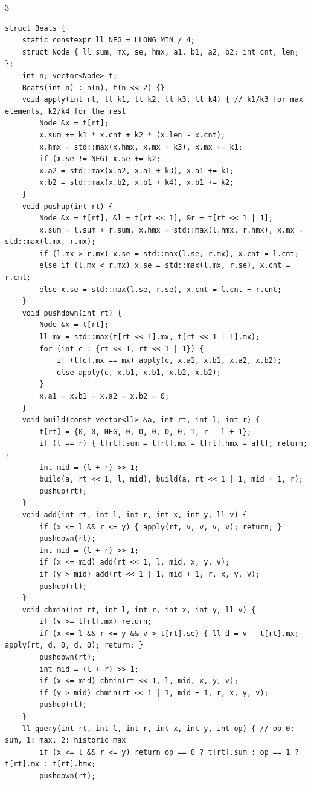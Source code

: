 \documentclass[8pt]{extarticle}
\begin{document}
\begin{multicols*}{3}
\begin{lstlisting}
struct Beats {
    static constexpr ll NEG = LLONG_MIN / 4;
    struct Node { ll sum, mx, se, hmx, a1, b1, a2, b2; int cnt, len; };
    int n; vector<Node> t;
    Beats(int n) : n(n), t(n << 2) {}
    void apply(int rt, ll k1, ll k2, ll k3, ll k4) { // k1/k3 for max elements, k2/k4 for the rest
        Node &x = t[rt];
        x.sum += k1 * x.cnt + k2 * (x.len - x.cnt);
        x.hmx = std::max(x.hmx, x.mx + k3), x.mx += k1;
        if (x.se != NEG) x.se += k2;
        x.a2 = std::max(x.a2, x.a1 + k3), x.a1 += k1;
        x.b2 = std::max(x.b2, x.b1 + k4), x.b1 += k2;
    }
    void pushup(int rt) {
        Node &x = t[rt], &l = t[rt << 1], &r = t[rt << 1 | 1];
        x.sum = l.sum + r.sum, x.hmx = std::max(l.hmx, r.hmx), x.mx = std::max(l.mx, r.mx);
        if (l.mx > r.mx) x.se = std::max(l.se, r.mx), x.cnt = l.cnt;
        else if (l.mx < r.mx) x.se = std::max(l.mx, r.se), x.cnt = r.cnt;
        else x.se = std::max(l.se, r.se), x.cnt = l.cnt + r.cnt;
    }
    void pushdown(int rt) {
        Node &x = t[rt];
        ll mx = std::max(t[rt << 1].mx, t[rt << 1 | 1].mx);
        for (int c : {rt << 1, rt << 1 | 1}) {
            if (t[c].mx == mx) apply(c, x.a1, x.b1, x.a2, x.b2);
            else apply(c, x.b1, x.b1, x.b2, x.b2);
        }
        x.a1 = x.b1 = x.a2 = x.b2 = 0;
    }
    void build(const vector<ll> &a, int rt, int l, int r) {
        t[rt] = {0, 0, NEG, 0, 0, 0, 0, 0, 1, r - l + 1};
        if (l == r) { t[rt].sum = t[rt].mx = t[rt].hmx = a[l]; return; }
        int mid = (l + r) >> 1;
        build(a, rt << 1, l, mid), build(a, rt << 1 | 1, mid + 1, r);
        pushup(rt);
    }
    void add(int rt, int l, int r, int x, int y, ll v) {
        if (x <= l && r <= y) { apply(rt, v, v, v, v); return; }
        pushdown(rt);
        int mid = (l + r) >> 1;
        if (x <= mid) add(rt << 1, l, mid, x, y, v);
        if (y > mid) add(rt << 1 | 1, mid + 1, r, x, y, v);
        pushup(rt);
    }
    void chmin(int rt, int l, int r, int x, int y, ll v) {
        if (v >= t[rt].mx) return;
        if (x <= l && r <= y && v > t[rt].se) { ll d = v - t[rt].mx; apply(rt, d, 0, d, 0); return; }
        pushdown(rt);
        int mid = (l + r) >> 1;
        if (x <= mid) chmin(rt << 1, l, mid, x, y, v);
        if (y > mid) chmin(rt << 1 | 1, mid + 1, r, x, y, v);
        pushup(rt);
    }
    ll query(int rt, int l, int r, int x, int y, int op) { // op 0: sum, 1: max, 2: historic max
        if (x <= l && r <= y) return op == 0 ? t[rt].sum : op == 1 ? t[rt].mx : t[rt].hmx;
        pushdown(rt);

\end{lstlisting}
\end{multicols*}
\end{document}
